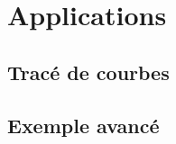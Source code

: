 \section{Applications}
\subsection{Tracé de courbes}
\setcounter{thequestion}{0}

\subsection{Exemple avancé}
\setcounter{thequestion}{0}

